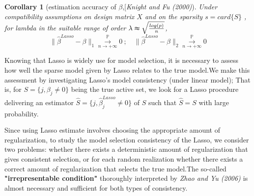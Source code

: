 \documentclass[12pt]{report}
\newtheorem{corollaire}{Corollary}
\begin{document}
\begin{corollaire}[estimation accuracy of $\beta$,[\textit{Knight and Fu (2000)}]
	Under compatibility assumptions on design matrix $X$ and on the sparsity $s=card\{S\}$ , for lambda in the suitable range of order $\lambda \thickapprox \sqrt{\frac{log(p)}{n}}$,
	\begin{equation}
		\parallel \hat{\beta}^{Lasso}-\beta \parallel_{1} \overset{\mathbb{P}}{\underset{n\rightarrow +\infty}{\longrightarrow}}0\ ;\quad \parallel \hat{\beta}^{Lasso}-\beta \parallel_{2} \overset{\mathbb{P}}{\underset{n\rightarrow +\infty}{\longrightarrow}}0
		\label{f39}
	\end{equation}
\end{corollaire}
Knowing that Lasso is widely use for model selection, it is necessary to assess how well the sparse model given by Lasso relates to the true model.We make this assessment by investigating Lasso's model consistency (under linear model); That is, for $S=\big\{ j, \beta_{j} \neq 0\big\}$ being the true active set, we look for a Lasso procedure delivering an estimator $\hat{S}=\big\{ j, \hat{\beta}^{Lasso}_{j} \neq 0\big\}$ of $S$ such that $\hat{S}=S$ with large probability.

Since using Lasso estimate involves choosing the appropriate amount of regularization, to study the model selection consistency of the Lasso, we consider two problems: whether there exists a deterministic amount of regularization that gives consistent selection, or for each random realization whether there exists a correct amount of regularization that selects the true model.The so-called \textbf{"irrepresentable condition"} thoroughly interpreted by \textit{Zhao and Yu (2006) \cite {nref15}} is almost necessary and sufficient for both types of consistency.
\end{document}
